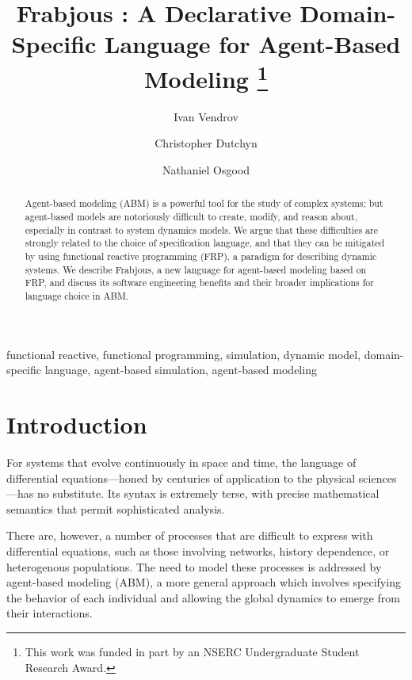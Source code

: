 \documentclass[oribibl]{llncs}
\begin{document}
\lstset{language=Haskell}
%

\title{Frabjous : A Declarative Domain-Specific Language for Agent-Based Modeling \thanks{This work was funded in part by an NSERC Undergraduate Student Research Award.}}


\author{Ivan Vendrov \and Christopher Dutchyn \and Nathaniel Osgood}

\maketitle
\begin{abstract}
Agent-based modeling (ABM) is a powerful tool for the study of complex systems; but agent-based models are notoriously difficult to create, modify, and reason about, especially in contrast to system dynamics models. We argue that these difficulties are strongly related to the choice of specification language, and that they can be mitigated by using functional reactive programming (FRP), a paradigm for describing dynamic systems. We describe Frabjous, a new language for agent-based modeling based on FRP, and discuss its software engineering benefits and their broader implications for language choice in ABM. 
\end{abstract}

\keywords
functional reactive, functional programming, simulation, dynamic model, domain-specific language, agent-based simulation, agent-based modeling

\section{Introduction}

For systems that evolve continuously in space and time, the language of differential equations---honed by centuries of application to the physical sciences---has no substitute. Its syntax is extremely terse, with precise mathematical semantics that permit sophisticated analysis. 

There are, however, a number of processes that are difficult to express with differential equations, such as those involving networks, history dependence, or heterogenous populations\cite{network_structure,system_dyn_tradeoffs}. The need to model these processes is addressed by agent-based modeling (ABM), a more general approach which involves specifying the behavior of each individual and allowing the global dynamics to emerge from their interactions.
  
\end{document}
